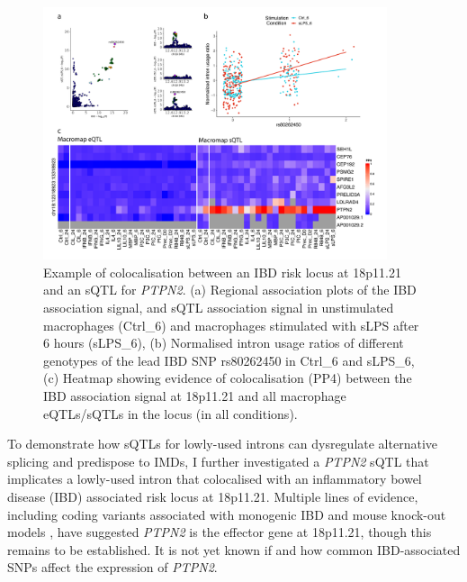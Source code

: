 \begin{figure}[H]
  \centering
  \includegraphics[width=0.9\textwidth]{ptpn2_manhattan_heatmap}
  \caption[Colocalisation between a low-usage \textit{PTPN2} intron and an IBD-associated locus]{Example of colocalisation between an IBD risk locus at 18p11.21 and an sQTL for \textit{PTPN2}.  (a) Regional association plots of the IBD association signal, and sQTL association signal in unstimulated macrophages (Ctrl\_6) and macrophages stimulated with sLPS after 6 hours (sLPS\_6), (b) Normalised intron usage ratios of different genotypes of the lead IBD SNP rs80262450 in Ctrl\_6 and sLPS\_6, (c) Heatmap showing evidence of colocalisation (PP4) between the IBD association signal at 18p11.21 and all macrophage eQTLs/sQTLs in the locus (in all conditions).}
  \label{fig:ptpn2_manhattan_heatmap}   
\end{figure}
To demonstrate how sQTLs for lowly-used introns can dysregulate alternative splicing and predispose to IMDs, I further investigated a \textit{PTPN2} sQTL that implicates a lowly-used intron that colocalised with an inflammatory bowel disease (IBD) associated risk locus at 18p11.21. Multiple lines of evidence, including coding variants associated with monogenic IBD \cite{Parlato2020-lh,Pike2018-wn} and mouse knock-out models \cite{Spalinger2018-mb,Spalinger2022-xj}, have suggested \textit{PTPN2} is the effector gene at 18p11.21, though this remains to be established. It is not yet known if and how common IBD-associated SNPs affect the expression of \textit{PTPN2}. \\

